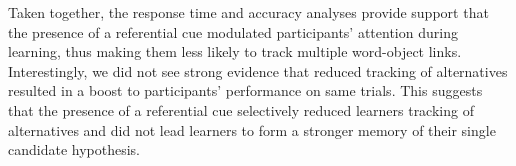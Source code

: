 \documentclass[10pt,letterpaper]{article}
\begin{document}

Taken together, the response time and accuracy analyses provide support that the presence of a referential cue modulated participants' attention during learning, thus making them less likely to track multiple word-object links. Interestingly, we did not see strong evidence that reduced tracking of alternatives resulted in a boost to participants' performance on same trials. This suggests that the presence of a referential cue selectively reduced learners tracking of alternatives and did not lead learners to form a stronger memory of their single candidate hypothesis. 

\end{document}
